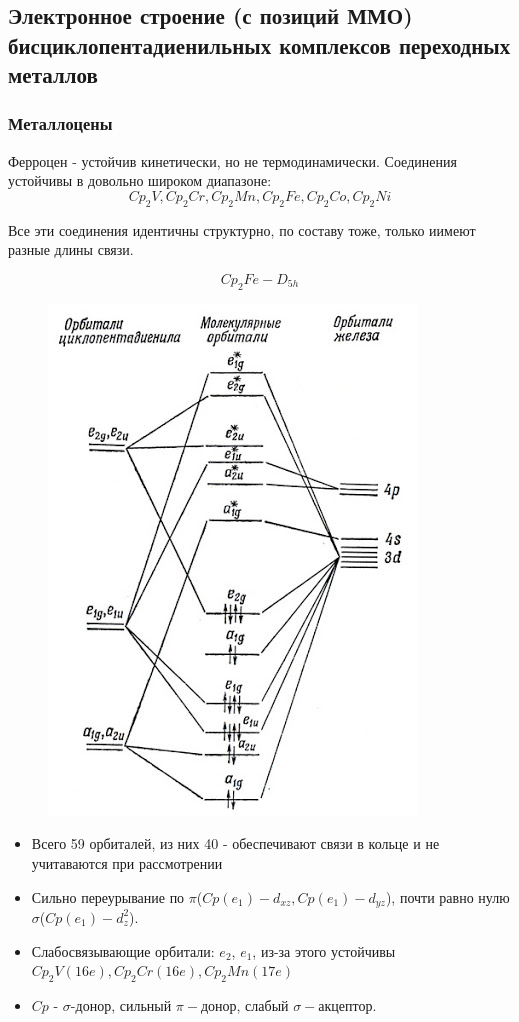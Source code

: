 \subsection{Электронное строение (с позиций ММО) бисциклопентадиенильных комплексов переходных металлов}

\subsubsection*{Металлоцены}
Ферроцен - устойчив кинетически, но не термодинамически. Соединения устойчивы в довольно широком диапазоне: 
$$Cp_2V, Cp_2Cr, Cp_2Mn, Cp_2Fe, Cp_2Co, Cp_2Ni$$

Все эти соединения идентичны структурно, по составу тоже, только иимеют разные длины связи.

$$Cp_2Fe - D_{5h}$$

\begin{figure}[H]
\centering
\includegraphics[scale=.500]{images/CP.jpg}
\caption{}
\label{}
\end{figure}

\begin{itemize}

\item Всего 59 орбиталей, из них 40 - обеспечивают связи в кольце и не учитаваются при рассмотрении

\item Сильно переурывание по $\pi$($Cp(e_1) - d_{xz}, Cp(e_1) - d_{yz}$), почти равно нулю $\sigma$($Cp(e_1) - d_z^2$).

\item Слабосвязывающие орбитали: $e_2$, $e_1$, из-за этого устойчивы $Cp_2V(16e), Cp_2Cr(16e), Cp_2Mn(17e)$

\item $Cp$ - $\sigma$-донор, сильный $\pi-$донор, слабый $\sigma-$акцептор.
\end{itemize}
